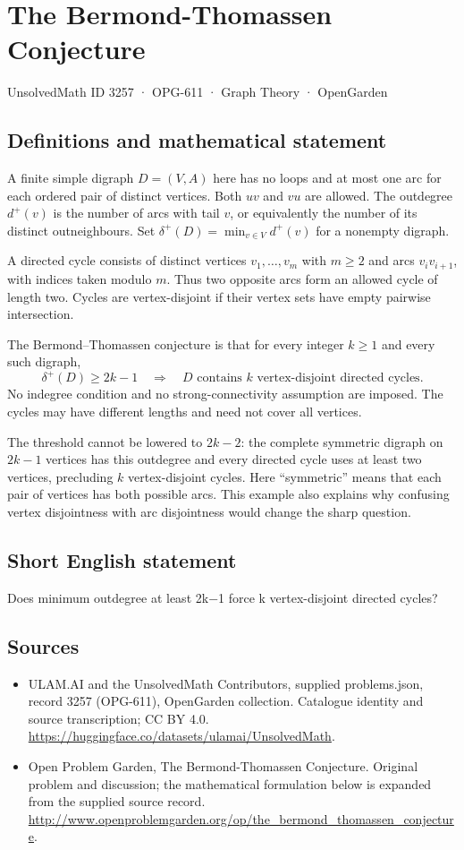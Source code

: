 \documentclass[11pt,a4paper]{article}
\begin{document}
\section*{The Bermond-Thomassen Conjecture}\label{3257}
{\small UnsolvedMath ID 3257 · OPG-611 · Graph Theory · OpenGarden}
\subsection{Definitions and mathematical statement}
A finite simple digraph $D=(V,A)$ here has no loops and at most one arc
for each ordered pair of distinct vertices. Both $uv$ and $vu$ are
allowed. The outdegree $d^+(v)$ is the number of arcs with tail $v$, or
equivalently the number of its distinct outneighbours. Set
$\delta^+(D)=\min_{v\in V}d^+(v)$ for a nonempty digraph.

A directed cycle consists of distinct vertices $v_1,\ldots,v_m$ with
$m\ge2$ and arcs $v_iv_{i+1}$, with indices taken modulo $m$. Thus two
opposite arcs form an allowed cycle of length two. Cycles are
vertex-disjoint if their vertex sets have empty pairwise intersection.

The Bermond--Thomassen conjecture is that for every integer $k\ge1$ and
every such digraph,
\[
         \delta^+(D)\ge2k-1
        \quad\Longrightarrow\quad
        D\text{ contains }k\text{ vertex-disjoint directed cycles}.
\]
No indegree condition and no strong-connectivity assumption are imposed.
The cycles may have different lengths and need not cover all vertices.

The threshold cannot be lowered to $2k-2$: the complete symmetric
digraph on $2k-1$ vertices has this outdegree and every directed cycle
uses at least two vertices, precluding $k$ vertex-disjoint cycles.
Here ``symmetric'' means that each pair of vertices has both possible
arcs. This example also explains why confusing vertex disjointness with
arc disjointness would change the sharp question.
\subsection{Short English statement}
Does minimum outdegree at least 2k−1 force k vertex-disjoint directed cycles?
\subsection{Sources}
\begin{itemize}
\item[S1] ULAM.AI and the UnsolvedMath Contributors, supplied problems.json, record 3257 (OPG-611), OpenGarden collection. Catalogue identity and source transcription; CC BY 4.0.
\url{https://huggingface.co/datasets/ulamai/UnsolvedMath}.
\item[S2] Open Problem Garden, The Bermond-Thomassen Conjecture. Original problem and discussion; the mathematical formulation below is expanded from the supplied source record.
\url{http://www.openproblemgarden.org/op/the_bermond_thomassen_conjecture}.
\end{itemize}
\end{document}
